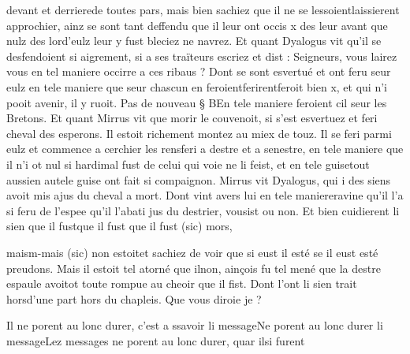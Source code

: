\documentclass{article}
\begin{document}
\begin{pages}
                  devant et derrierede toutes pars, mais bien sachiez 
                  que il ne se 
                  lessoientlaissierent approchier, ainz se sont tant deffendu que il leur ont occis x des
               leur avant que nulz 
                  des lord’eulz leur y fust bleciez 
                  ne navrez. Et quant Dyalogus vit qu’il se
               desfendoient si aigrement, si a ses traïteurs escriez et dist : Seigneurs, vous lairez vous en tel maniere occirre a ces ribaus
                  ? Dont se sont esvertué et ont feru seur eulz en tele maniere que seur
               chascun en 
                  feroientferirentferoit bien x, et qui n’i pooit avenir, il y ruoit. \pend
            \pstart Pas de nouveau § BEn
               tele maniere feroient cil seur les Bretons.
               Et quant Mirrus vit que morir le couvenoit, si
               s’est esvertuez et feri cheval des esperons. Il estoit richement montez au miex de
               touz. Il se feri parmi eulz et 
                  commence a cerchier les rensferi a destre et a senestre, en tele maniere que 
                  il n’i ot nul si hardimal fust de celui qui voie ne li feist, et 
                  en tele guisetout aussien autele guise ont fait si compaignon. Mirrus vit Dyalogus, qui i des siens avoit mis 
                  ajus du cheval a mort. Dont vint 
                  avers lui en tele 
                  maniereravine qu’il l’a 
                  si feru de l’espee qu’il l’abati jus du destrier, vousist ou non. Et bien
               cuidierent li sien 
                  que il fustque il fust que il fust (sic) mors, 
                  
                        maism-mais (sic) non estoitet sachiez de voir que si eust il esté se il eust esté
                     preudons. Mais il 
                  estoit tel atorné que ilnon, ainçois fu tel mené que la destre espaule 
                  avoitot toute rompue au cheoir que il fist. Dont l’ont li sien trait 
                  horsd'une part hors du chapleis. Que vous diroie je ?
               
                  Il ne porent au lonc durer, c’est a ssavoir li messageNe porent au lonc durer li messageLez messages ne porent au lonc durer, quar 
                  ilsi furent 
                  

\end{pages}
\end{document}
